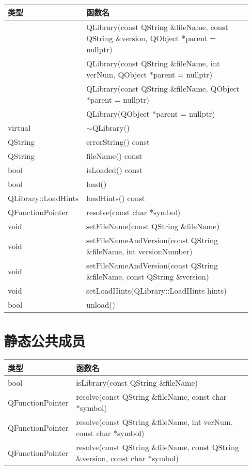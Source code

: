\begin{longtable}[l]{|l|m{25em}|}
\hline
 类型& 	函数名\\
\hline
	&QLibrary(const QString \&fileName, const QString \&version,
   QObject *parent = nullptr)\\
\hline
	&QLibrary(const QString \&fileName, int verNum, QObject *parent =
   nullptr)\\
\hline
	&QLibrary(const QString \&fileName, QObject *parent = nullptr)\\
\hline
	&QLibrary(QObject *parent = nullptr)\\
\hline
virtual& 	$\sim$QLibrary()\\
\hline
QString& 	errorString() const\\
\hline
QString& 	fileName() const\\
\hline
bool& 	isLoaded() const\\
\hline
bool& 	load()\\
\hline
QLibrary::LoadHints& 	loadHints() const\\
\hline
QFunctionPointer& 	resolve(const char *symbol)\\
\hline
void& 	setFileName(const QString \&fileName)\\
\hline
void& 	setFileNameAndVersion(const QString \&fileName, int versionNumber)\\
\hline
void& 	setFileNameAndVersion(const QString \&fileName, const QString
      \&version)\\
\hline
void& 	setLoadHints(QLibrary::LoadHints hints)\\
\hline
bool& 	unload()\\
\hline
\end{longtable}

\section{静态公共成员}

\begin{tabular}{|l|l|}
\hline
类型& 	函数名\\
\hline
bool& 	isLibrary(const QString \&fileName)\\
\hline
QFunctionPointer& 	resolve(const QString \&fileName, const char
                  *symbol)\\
\hline
QFunctionPointer& 	resolve(const QString \&fileName, int verNum, const char *symbol)\\
\hline
QFunctionPointer& 	resolve(const QString \&fileName, const QString \&version, const char *symbol)\\
\hline
\end{tabular}

